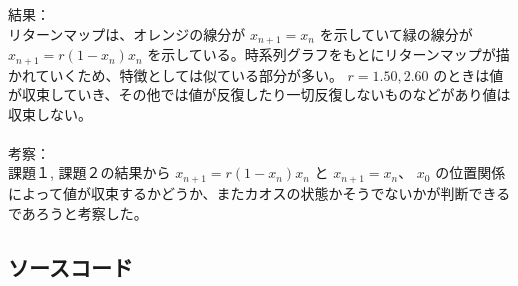 結果：\\
リターンマップは、オレンジの線分が $x_{n+1} = x_n$ を示していて緑の線分が$x_{n+1} = r(1 −x_n)x_n$ を示している。時系列グラフをもとにリターンマップが描かれていくため、特徴としては似ている部分が多い。 $r = 1.50, 2.60$ のときは値が収束していき、その他では値が反復したり一切反復しないものなどがあり値は収束しない。\\\\

考察：\\
課題１, 課題２の結果から $x_{n+1} = r(1 −x_n)x_n$ と $x_{n+1} = x_n$、 $x_0$ の位置関係によって値が収束するかどうか、またカオスの状態かそうでないかが判断できるであろうと考察した。
\subsection{ソースコード}
